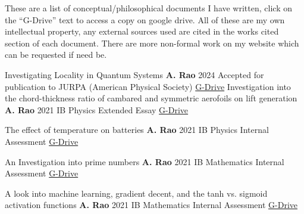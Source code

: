 \documentclass[%
               doublesided,
               paper=a4,
               fontsize=10pt
              ]{my-resume}
\begin{document}
These are a list of conceptual/philosophical documents I have written, click on the ``G-Drive'' text to access a copy on google drive. All of these are my own intellectual property, any external sources used are cited in the works cited section of each document. There are more non-formal work on my website which can be requested if need be.


\bigskip

\publication
	{Investigating Locality in Quantum Systems} %
	{\textbf{A. Rao}} %
	{2024} %
	{Accepted for publication to JURPA (American Physical Society)} %
    {\href{https://drive.google.com/file/d/11Jxuwosy_RHILA6zEOKnV90gzT-gSnZz/view?usp=drive_link}{G-Drive}}
\publication
	{Investigation into the chord-thickness ratio of cambared and symmetric aerofoils on lift generation} %
	{\textbf{A. Rao}} %
	{2021} %
	{IB Physics Extended Essay} %
	{\href{https://drive.google.com/file/d/1iNuz6GyCQ5tocmtymL6gZ6pcuWnWGaJR/view?usp=sharing}{G-Drive}} %
	
\publication
	{The effect of temperature on batteries} %
	{\textbf{A. Rao}} %
	{2021} %
	{IB Physics Internal Assessment} %
	{\href{https://drive.google.com/file/d/1GWGu-Hs1JLPM09Opu7atbjhXZf3iJpHj/view?usp=sharing}{G-Drive}} %

\publication
	{An Investigation into prime numbers} %
	{\textbf{A. Rao}} %
	{2021} %
	{IB Mathematics Internal Assessment} %
	{\href{https://drive.google.com/file/d/14eHbjy9PMu8KufXfvyv0dE8Dfuy3ZLTy/view?usp=sharing}{G-Drive}} %
	
\publication
	{A look into machine learning, gradient decent, and the tanh vs. sigmoid activation functions} %
	{\textbf{A. Rao}} %
	{2021} %
	{IB Mathematics Internal Assessment} %
	{\href{https://drive.google.com/file/d/1kVpSQky80j6iVUuVikYTPtVWeeBq6dii/view?usp=sharing}{G-Drive}} %
	
\end{document}
